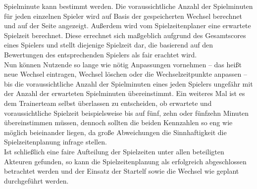 Spielminute kann bestimmt werden. Die voraussichtliche Anzahl der Spielminuten für 
jeden einzelnen Spieler wird auf Basis der gespeicherten Wechsel berechnet und auf 
der Seite angezeigt. Außerdem wird vom Spielzeitenplaner eine erwartete Spielzeit 
berechnet. Diese errechnet sich maßgeblich aufgrund des Gesamtscores eines Spielers 
und stellt diejenige Spielzeit dar, die basierend auf den Bewertungen des 
entsprechenden Spielers als fair erachtet wird. \\ 
Nun können Nutzende so lange wie nötig Anpassungen vornehmen -- das heißt neue 
Wechsel eintragen, Wechsel löschen oder die Wechselzeitpunkte anpassen -- bis 
die voraussichtliche Anzahl der Spielminuten eines jeden Spielers ungefähr mit der 
Anzahl der erwarteten Spielminuten übereinstimmt. Ein weiteres Mal ist es dem 
Trainerteam selbst überlassen zu entscheiden, ob erwartete und voraussichtliche 
Spielzeit beispielsweise bis auf fünf, zehn oder fünfzehn Minuten übereinstimmen 
müssen, dennoch sollten die beiden Kennzahlen so eng wie möglich beieinander 
liegen, da große Abweichungen die Sinnhaftigkeit die Spielzeitenplanung infrage 
stellen. \\ 
Ist schließlich eine faire Aufteilung der Spielzeiten unter allen beteiligten 
Akteuren gefunden, so kann die Spielzeitenplanung als erfolgreich abgeschlossen 
betrachtet werden und der Einsatz der Startelf sowie die Wechsel wie geplant 
durchgeführt werden. 

